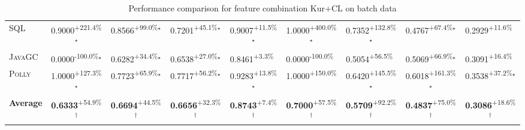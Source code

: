 \begin{table}[htbp]
\begin{tabular}{l|cccc|cccc}
\textsc{SQL} & \cellcolor{green!30}0.9000\textsuperscript{+221.4\%}$^\star$ & \cellcolor{green!30}0.8566\textsuperscript{+99.0\%}$^\star$ & \cellcolor{green!30}0.7201\textsuperscript{+45.1\%}$^\star$ & \cellcolor{green!30}0.9007\textsuperscript{+11.5\%}$^\star$ & \cellcolor{green!30}1.0000\textsuperscript{+400.0\%}$^\star$ & \cellcolor{green!30}0.7352\textsuperscript{+132.8\%}$^\star$ & \cellcolor{green!30}0.4767\textsuperscript{+67.4\%}$^\star$ & \cellcolor{green!30}0.2929\textsuperscript{+11.6\%}$^{\,\,\,}$ \\
\textsc{JavaGC} & \cellcolor{red!30}0.0000\textsuperscript{-100.0\%}$^\star$ & \cellcolor{green!30}0.6282\textsuperscript{+34.4\%}$^\star$ & \cellcolor{green!30}0.6538\textsuperscript{+27.0\%}$^\star$ & \cellcolor{green!30}0.8461\textsuperscript{+3.3\%}$^{\,\,\,}$ & \cellcolor{red!30}0.0000\textsuperscript{-100.0\%}$^{\,\,\,}$ & \cellcolor{green!30}0.5054\textsuperscript{+56.5\%}$^{\,\,\,}$ & \cellcolor{green!30}0.5069\textsuperscript{+66.9\%}$^\star$ & \cellcolor{green!30}0.3091\textsuperscript{+16.4\%}$^{\,\,\,}$ \\
\textsc{Polly} & \cellcolor{green!30}1.0000\textsuperscript{+127.3\%}$^\star$ & \cellcolor{green!30}0.7723\textsuperscript{+65.9\%}$^\star$ & \cellcolor{green!30}0.7717\textsuperscript{+56.2\%}$^\star$ & \cellcolor{green!30}0.9283\textsuperscript{+13.8\%}$^\star$ & \cellcolor{green!30}1.0000\textsuperscript{+150.0\%}$^{\,\,\,}$ & \cellcolor{green!30}0.6420\textsuperscript{+145.5\%}$^\star$ & \cellcolor{green!30}0.6018\textsuperscript{+161.3\%}$^\star$ & \cellcolor{green!30}0.3538\textsuperscript{+37.2\%}$^\star$ \\
\hline
\textbf{Average} & \cellcolor{green!30}\textbf{0.6333}\textsuperscript{+54.9\%}$^\dagger$ & \cellcolor{green!30}\textbf{0.6694}\textsuperscript{+44.5\%}$^\dagger$ & \cellcolor{green!30}\textbf{0.6656}\textsuperscript{+32.3\%}$^\dagger$ & \cellcolor{green!30}\textbf{0.8743}\textsuperscript{+7.4\%}$^\dagger$ & \cellcolor{green!30}\textbf{0.7000}\textsuperscript{+57.5\%}$^\dagger$ & \cellcolor{green!30}\textbf{0.5709}\textsuperscript{+92.2\%}$^\dagger$ & \cellcolor{green!30}\textbf{0.4837}\textsuperscript{+75.0\%}$^\dagger$ & \cellcolor{green!30}\textbf{0.3086}\textsuperscript{+18.6\%}$^\dagger$ \\
\hline
\end{tabular}
\caption{Performance comparison for feature combination Kur+CL on batch data}
\label{tab:combo_Kur_CL_performance_batch}
\end{table}